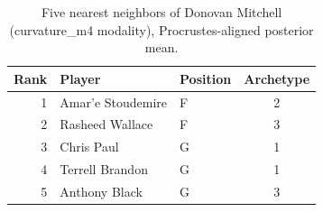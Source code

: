 \begin{table}[htbp]
  \centering\small
  \begin{tabular}{rllc}
    \toprule
    Rank & Player & Position & Archetype \\
    \midrule
    1 & Amar'e Stoudemire & F & 2 \\
    2 & Rasheed Wallace & F & 3 \\
    3 & Chris Paul & G & 1 \\
    4 & Terrell Brandon & G & 1 \\
    5 & Anthony Black & G & 3 \\
    \bottomrule
  \end{tabular}
  \caption{Five nearest neighbors of Donovan Mitchell (curvature_m4 modality), Procrustes-aligned posterior mean.}
  \label{tab:Donovan_Mitchell_neighbors_curvature_m4}
\end{table}

